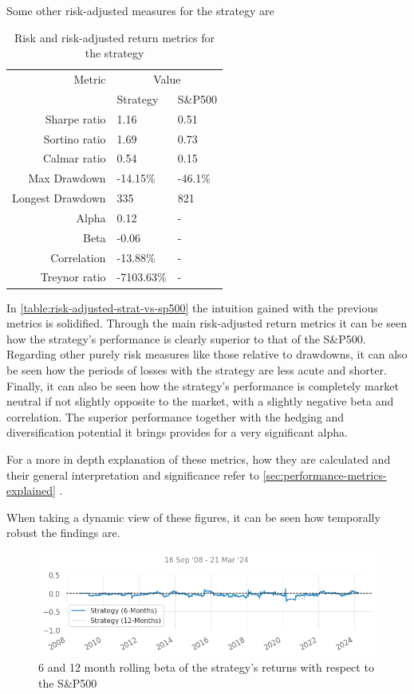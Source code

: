 Some other risk-adjusted measures for the strategy are 
\begin{table}[ht]
    \centering
    \begin{tabular}{rll}
        \toprule
        Metric & \multicolumn{2}{c}{Value} \\ 
        \cmidrule(lr){2-3}
            & Strategy & S\&P500 \\
        \midrule
        Sharpe ratio & 1.16 & 0.51 \\
        Sortino ratio & 1.69 & 0.73 \\
        Calmar ratio & 0.54 & 0.15 \\
        Max Drawdown & -14.15\% & -46.1\% \\
        Longest Drawdown & 335 & 821 \\
        Alpha & 0.12 & - \\
        Beta & -0.06 & - \\
        Correlation & -13.88\% & - \\
        Treynor ratio & -7103.63\% & - \\
        \bottomrule
    \end{tabular}
    \caption{Risk and risk-adjusted return metrics for the strategy}
    \label{table:risk-adjusted-strat-vs-sp500}
\end{table}

In \autoref{table:risk-adjusted-strat-vs-sp500} the intuition gained with the previous metrics is solidified. Through the main risk-adjusted return metrics it can be seen how the strategy's performance is clearly superior to that of the S\&P500. Regarding other purely risk measures like those relative to drawdowns, it can also be seen how the periods of losses with the strategy are less acute and shorter. Finally, it can also be seen how the strategy's performance is completely market neutral if not slightly opposite to the market, with a slightly negative beta and correlation. The superior performance together with the hedging and diversification potential it brings provides for a very significant alpha. 

For a more in depth explanation of these metrics, how they are calculated and their general interpretation and significance refer to \autoref{sec:performance-metrics-explained} .

When taking a dynamic view of these figures, it can be seen how temporally robust the findings are.

\begin{figure}[ht]
    \includegraphics[width=\linewidth]{assets/strat-vs-sp500-rolling-beta.png}
    \caption{6 and 12 month rolling beta of the strategy's returns with respect to the S\&P500}
    \label{fig:strat-vs-sp500-rolling-beta}
\end{figure}

